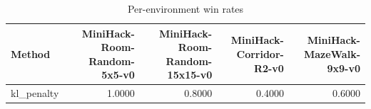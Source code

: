 \begin{table}[htbp]
\centering
\caption{Per-environment win rates}
\label{tab:per-env}
\begin{tabular}{lrrrr}
\toprule
\textbf{Method} & \textbf{MiniHack-Room-Random-5x5-v0} & \textbf{MiniHack-Room-Random-15x15-v0} & \textbf{MiniHack-Corridor-R2-v0} & \textbf{MiniHack-MazeWalk-9x9-v0} \\
\midrule
kl\_penalty & 1.0000 & 0.8000 & 0.4000 & 0.6000 \\
\bottomrule
\end{tabular}
\end{table}